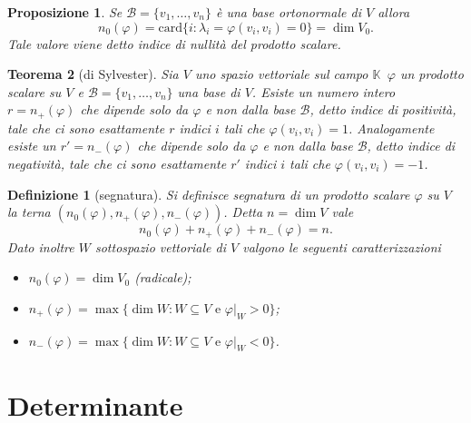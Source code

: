 \documentclass[9pt, a4paper]{article}
\newcommand{\K}{\mathbb{K}}
\newcommand{\letvs}{Sia $ V $ uno spazio vettoriale sul campo $ \K $}
\theoremstyle{mythm}
\newtheorem{definition}{Definizione}[section]
\newtheorem{thm}{Teorema}[section]
\newtheorem{prop}[thm]{Proposizione}
\begin{document}
\begin{prop}
	Se $ \mathscr{B} = \{v_1, \ldots, v_n\} $ è una base ortonormale di $ V $ allora \[n_0 (\varphi) = \mathrm{card}\{i : \lambda_i = \varphi(v_i, v_i) = 0\} = \dim V_0.\] Tale valore viene detto indice di nullità del prodotto scalare. 
\end{prop}

\begin{thm}[di Sylvester]
	\letvs \, $ \varphi $ un prodotto scalare su $ V $ e $ \mathscr{B} = \{v_1, \ldots, v_n\} $ una base di $ V $. Esiste un numero intero $ r = n_{+} (\varphi) $ che dipende solo da $ \varphi $ e non dalla base $ \mathscr{B} $, detto indice di positività, tale che ci sono esattamente $ r $ indici $ i $ tali che $ \varphi(v_i, v_i) = 1 $. Analogamente esiste un $ r' = n_{-} (\varphi) $ che dipende solo da $ \varphi $ e non dalla base $ \mathscr{B} $, detto indice di negatività, tale che ci sono esattamente $ r' $ indici $ i $ tali che $ \varphi(v_i, v_i) = - 1 $.
\end{thm}

\begin{definition}[segnatura]
	Si definisce segnatura di un prodotto scalare $ \varphi $ su $ V $ la terna \linebreak $ (n_0 (\varphi), n_{+} (\varphi), n_{-} (\varphi)) $. Detta $ n = \dim V $ vale \[n_0 (\varphi) + n_{+} (\varphi) + n_{-} (\varphi) = n.\] Dato inoltre $ W $ sottospazio vettoriale di $ V $ valgono le seguenti caratterizzazioni
	\begin{itemize}
		\item $ n_0 (\varphi) = \dim V_0 $ (radicale);
		\item $ n_{+} (\varphi) = \max{\{\dim W : W \subseteq V \text{ e } \varphi|_{W} > 0\}} $;
		\item $ n_{-} (\varphi) = \max{\{\dim W : W \subseteq V \text{ e } \varphi|_{W} < 0\}} $.
	\end{itemize}
\end{definition}

\clearpage

\section{Determinante}
\end{document}
